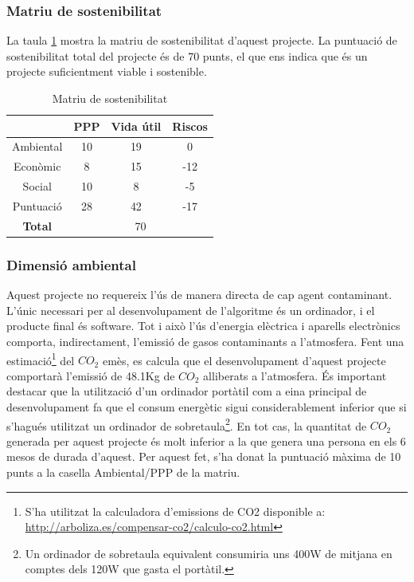 \documentclass[10pt,a4paper]{article}
\begin{document}
\subsubsection{Matriu de sostenibilitat}
La taula \ref{tab:matriu_sostenibilitat} mostra la matriu de sostenibilitat d'aquest projecte. La puntuació de sostenibilitat total del projecte és de 70 punts, el que ens indica que és un projecte suficientment viable i sostenible.
\begin{table}[!htb]
    \centering
    \begin{tabular}{|c|c|c|c|}
    \hline
         & PPP & Vida útil & Riscos \\
         \hline\hline
        Ambiental & 10 & 19 & 0 \\
        \hline
        Econòmic & 8 & 15 & -12 \\
        \hline
        Social & 10 & 8 & -5 \\
        \hline\hline
        Puntuació & 28 & 42  & -17\\
        \hline
        \textbf{Total} & \multicolumn{3}{c|}{70} \\
        \hline
    \end{tabular}
    \caption{Matriu de sostenibilitat}
    \label{tab:matriu_sostenibilitat}
\end{table}

\subsubsection{Dimensió ambiental}

Aquest projecte no requereix l'ús de manera directa de cap agent contaminant. L'únic necessari per al desenvolupament de l'algoritme és un ordinador, i el producte final és software. Tot i això l'ús d'energia elèctrica i aparells electrònics comporta, indirectament, l'emissió de gasos contaminants a l'atmosfera. Fent una estimació\footnote{S'ha utilitzat la calculadora d'emissions de CO2 disponible a: \url{http://arboliza.es/compensar-co2/calculo-co2.html}} del $CO_2$ emès, es calcula que el desenvolupament d'aquest projecte comportarà l'emissió de 48.1Kg de $CO_2$ alliberats a l'atmosfera. És important destacar que la utilització d'un ordinador portàtil com a eina principal de desenvolupament fa que el consum energètic sigui considerablement inferior que si s'hagués utilitzat un ordinador de sobretaula\footnote{Un ordinador de sobretaula equivalent consumiria uns 400W de mitjana en comptes dels 120W que gasta el portàtil.}. En tot cas, la quantitat de $CO_2$ generada per aquest projecte és molt inferior a la que genera una persona en els 6 mesos de durada d'aquest. Per aquest fet, s'ha donat la puntuació màxima de 10 punts a la casella Ambiental/PPP de la matriu.
\end{document}

